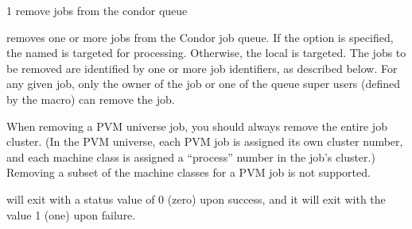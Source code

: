 \begin{ManPage}{\label{man-condor-rm}}{1}
{remove jobs from the condor queue}
\Synopsis {}
\ToolArgsBase
\ToolArgsLocate
{}


\Description

 removes one or more jobs from the Condor job queue.  
If the  option is specified, the named  is targeted
for processing.  
Otherwise, the local  is targeted.
The jobs to be removed are identified by one or more job identifiers, as
described below.
For any given job, only the owner of the job or one of the queue super users
(defined by the  macro) can remove the job.

\begin{Options}
	\ToolArgsBaseDesc
	\ToolArgsLocateDesc
\end{Options}

\GenRem

When removing a PVM universe job, you should always remove the entire
job cluster.  (In the PVM universe, each PVM job is assigned its own
cluster number, and each machine class is assigned a ``process''
number in the job's cluster.)  Removing a subset of the machine
classes for a PVM job is not supported.

\ExitStatus

 will exit with a status value of 0 (zero) upon success,
and it will exit with the value 1 (one) upon failure.

\end{ManPage}
